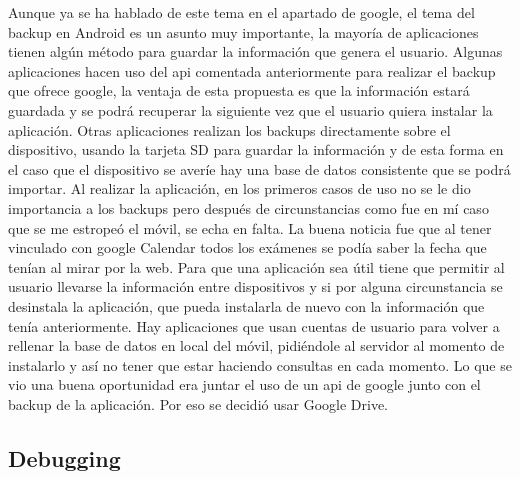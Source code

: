 Aunque ya se ha hablado de este tema en el apartado de google, el tema del backup en Android es un asunto muy importante, la mayoría de aplicaciones tienen algún método para guardar la información que genera el usuario.
Algunas aplicaciones hacen uso del api comentada anteriormente para realizar el backup que ofrece google, la ventaja de esta propuesta es que la información estará guardada y se podrá recuperar la siguiente vez que el usuario quiera instalar la aplicación.
Otras aplicaciones realizan los backups directamente sobre el dispositivo, usando la tarjeta SD para guardar la información y de esta forma en el caso que el dispositivo se averíe hay una base de datos consistente que se podrá importar.
Al realizar la aplicación, en los primeros casos de uso no se le dio importancia a los backups pero después de circunstancias como fue en mí caso que se me estropeó el móvil, se echa en falta. La buena noticia fue que al tener vinculado con google Calendar todos los exámenes se podía saber la fecha que tenían al mirar por la web.
Para que una aplicación sea útil tiene que permitir al usuario llevarse la información entre dispositivos y si por alguna circunstancia se desinstala la aplicación, que pueda instalarla de nuevo con la información que tenía anteriormente.
Hay aplicaciones que usan cuentas de usuario para volver a rellenar la base de datos en local del móvil, pidiéndole al servidor al momento de instalarlo y así no tener que estar haciendo consultas en cada momento.
Lo que se vio una buena oportunidad era juntar el uso de un api de google junto con el backup de la aplicación. Por eso se decidió usar Google Drive.

\subsection{Debugging}
\label{subsecc:Debugging}

